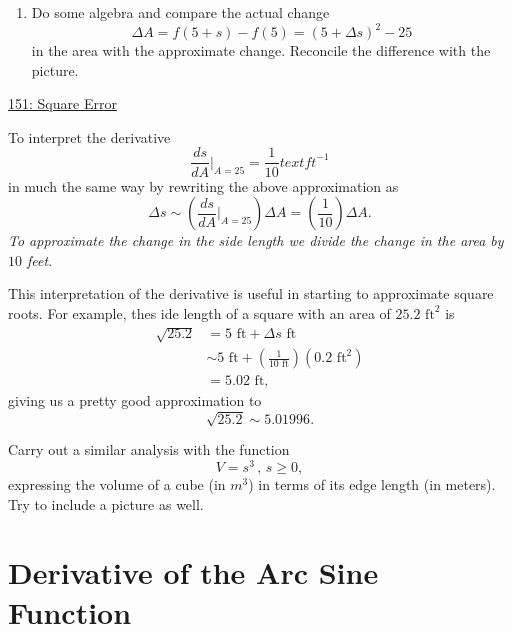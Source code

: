 \documentclass{ximera}
\begin{document}
\begin{example}
\begin{enumerate}
\item Do some algebra and compare the actual change 
\[
    \Delta A = f(5+s) - f(5) = (5+\Delta s)^2 - 25
\]
in the area with the approximate change. Reconcile the difference with the picture.

\end{enumerate}
\begin{freeResponse}
\end{freeResponse}

\begin{onlineOnly}
    \begin{center}
\end{center}
\end{onlineOnly}


\href{https://www.desmos.com/calculator/h2fm6mm8ua}{151: Square Error}


To interpret the derivative 
\[
    \frac{ds}{dA}\Big|_{A=25} = \frac{1}{10} text{ ft}^{-1}
\]
in much the same way by rewriting the above approximation as
\[
    \Delta s \sim \left( \frac{ds}{dA}\Big|_{A=25}\right)\Delta A = \left(\frac{1}{10}\right) \Delta A.
\]
\emph{To approximate the change in the side length we divide the change in the area by $10$ feet}.

This interpretation of the derivative is useful in starting to approximate square roots. For example,  thes ide length of a square with an area of $25.2 \text{ ft}^2$ is 
\begin{align*}
              \sqrt{25.2} &=      5 \text{ ft} + \Delta s  \text{ ft}  \\
                               & \sim 5 \text{ ft} +   \left(\frac{1}{10 \text{ ft}}\right)(0.2 \text{ ft}^2) \\
                                      &= 5.02 \text{ ft},
\end{align*}
giving us a pretty good approximation to 
\[
    \sqrt{25.2} \sim 5.01996 .
\]
\end{example}


\begin{exercise}  \label{ExLDFDFDdare}
Carry out a similar analysis with the function
\[
    V = s^3 \, , \, s\geq 0,
\]
expressing the volume of a cube (in $m^3$) in terms of its edge length (in meters). Try to include a picture as well.
\end{exercise}



\section{Derivative of the Arc Sine Function}
\end{document}
